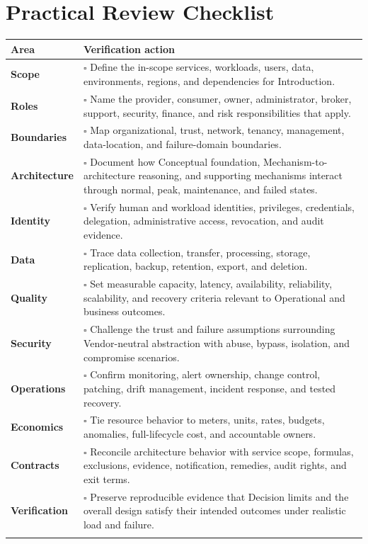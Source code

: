 \documentclass[11pt]{article}
\begin{document}
\section{Practical Review Checklist}
\begin{longtable}{@{}>{\bfseries\color{Teal}}p{}>{\RaggedRight\arraybackslash}p{}@{}}
\toprule\textbf{Area} & \textbf{Verification action}\\\midrule\endhead
Scope & $\square$ Define the in-scope services, workloads, users, data, environments, regions, and dependencies for Introduction. \\\addlinespace[2pt]
Roles & $\square$ Name the provider, consumer, owner, administrator, broker, support, security, finance, and risk responsibilities that apply. \\\addlinespace[2pt]
Boundaries & $\square$ Map organizational, trust, network, tenancy, management, data-location, and failure-domain boundaries. \\\addlinespace[2pt]
Architecture & $\square$ Document how Conceptual foundation, Mechanism-to-architecture reasoning, and supporting mechanisms interact through normal, peak, maintenance, and failed states. \\\addlinespace[2pt]
Identity & $\square$ Verify human and workload identities, privileges, credentials, delegation, administrative access, revocation, and audit evidence. \\\addlinespace[2pt]
Data & $\square$ Trace data collection, transfer, processing, storage, replication, backup, retention, export, and deletion. \\\addlinespace[2pt]
Quality & $\square$ Set measurable capacity, latency, availability, reliability, scalability, and recovery criteria relevant to Operational and business outcomes. \\\addlinespace[2pt]
Security & $\square$ Challenge the trust and failure assumptions surrounding Vendor-neutral abstraction with abuse, bypass, isolation, and compromise scenarios. \\\addlinespace[2pt]
Operations & $\square$ Confirm monitoring, alert ownership, change control, patching, drift management, incident response, and tested recovery. \\\addlinespace[2pt]
Economics & $\square$ Tie resource behavior to meters, units, rates, budgets, anomalies, full-lifecycle cost, and accountable owners. \\\addlinespace[2pt]
Contracts & $\square$ Reconcile architecture behavior with service scope, formulas, exclusions, evidence, notification, remedies, audit rights, and exit terms. \\\addlinespace[2pt]
Verification & $\square$ Preserve reproducible evidence that Decision limits and the overall design satisfy their intended outcomes under realistic load and failure. \\\addlinespace[2pt]
\bottomrule
\end{longtable}
\end{document}
